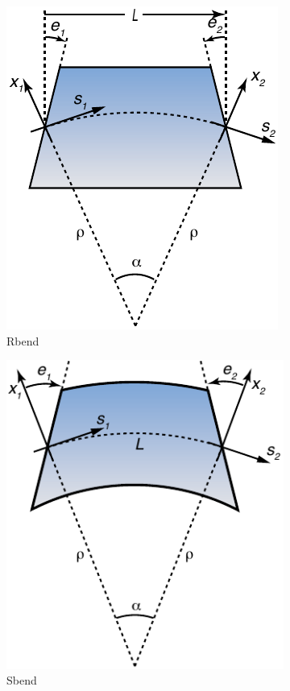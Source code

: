 \begin{figure}[tb]
  \centering
  \hfill
  \begin{subfigure}[b]{0.32\textwidth}
    \includegraphics{rbend-coords.pdf}
    \caption{Rbend}
    \label{f:rbend}
  \end{subfigure}
  \hfill
  \begin{subfigure}[b]{0.32\textwidth}
    \includegraphics{sbend-coords.pdf}
    \caption{Sbend}
    \label{f:sbend}
  \end{subfigure}
  \hfill
  \begin{subfigure}[b]{0.32\textwidth}

\end{subfigure}
\end{figure}
